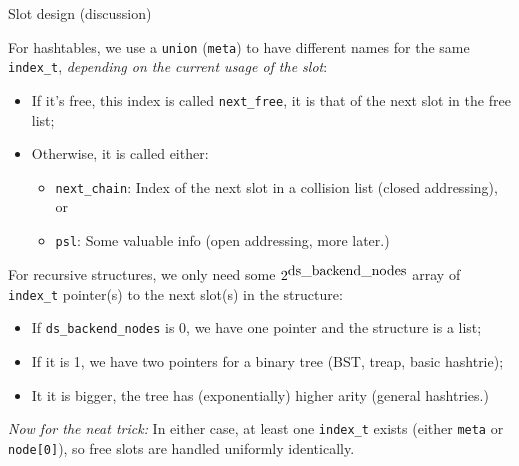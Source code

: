\begin{frame}[fragile]{Slot design (discussion)}

  For hashtables, we use a \lstinline{union} (\lstinline{meta}) to have different names for the same \lstinline{index_t}, {\em depending on the current usage of the slot}:

  \begin{itemize}
  \item If it's free, this index is called \lstinline{next_free}, it is that of the next slot in the free list;
  \item Otherwise, it is called either:
    \begin{itemize}
    \item \lstinline{next_chain}: Index of the next slot in a collision list (closed addressing), or
    \item \lstinline{psl}: Some valuable info (open addressing, more later.)
    \end{itemize}
  \end{itemize}
  
  For recursive structures, we only need some $2^{\mbox{\lstinline{ds_backend_nodes}}}$ array of \lstinline{index_t} pointer(s) to the next slot(s) in the structure:
  \begin{itemize}
  \item If \lstinline{ds_backend_nodes} is 0, we have one pointer and the structure is a list;
  \item If it is 1, we have two pointers for a binary tree (BST, treap, basic hashtrie);
  \item It it is bigger, the tree has (exponentially) higher arity (general hashtries.)
  \end{itemize}

  {\em Now for the neat trick:} In either case, at least one \lstinline{index_t} exists (either \lstinline{meta} or \lstinline{node[0]}), so free slots are handled uniformly identically.
  
\end{frame}


